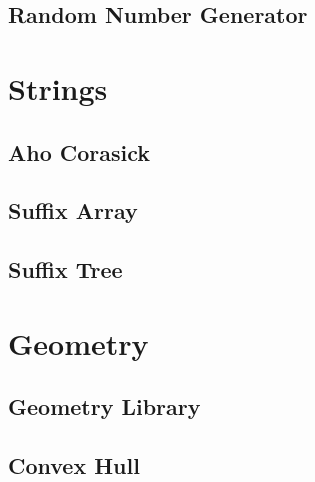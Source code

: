 \subsection{Random Number Generator}
\raggedbottom
\hrulefill

\section{Strings}
\subsection{Aho Corasick}
\raggedbottom
\hrulefill
\subsection{Suffix Array}
\raggedbottom
\hrulefill
\subsection{Suffix Tree}
\raggedbottom
\hrulefill

\section{Geometry}
\subsection{Geometry Library}
\raggedbottom
\hrulefill
\subsection{Convex Hull}
\raggedbottom
\hrulefill

